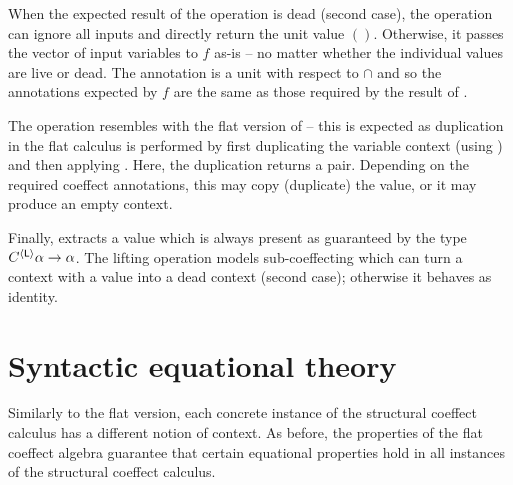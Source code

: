 \noindent
When the expected result of the  operation is dead (second case), the operation can
ignore all inputs and directly return the unit value $()$. Otherwise, it passes the vector of 
input variables to $f$ as-is -- no matter whether the individual values are live or dead. The
 annotation is a unit with respect to $\cap$ and so the annotations expected by $f$ are
the same as those required by the result of .

The  operation resembles with the flat version of  -- this is expected as
duplication in the flat calculus is performed by first duplicating the variable context (using 
) and then applying . Here, the duplication returns a pair. Depending on the
required coeffect annotations, this may copy (duplicate) the value, or it may produce an empty context.

Finally,  extracts a value which is always present as guaranteed by the type
$C^{\langle \textnormal{\sffamily L} \rangle}\alpha \rightarrow \alpha$. The lifting operation models 
sub-coeffecting which can turn a context with a value into a dead context (second case); otherwise
it behaves as identity.


%                                                                   
%

\section{Syntactic equational theory}
\label{sec:struct-syntax}

Similarly to the flat version, each concrete instance of the structural coeffect calculus has a 
different notion of context. As before, the properties of the flat coeffect algebra guarantee that 
certain equational properties hold in all instances of the structural coeffect calculus. 

